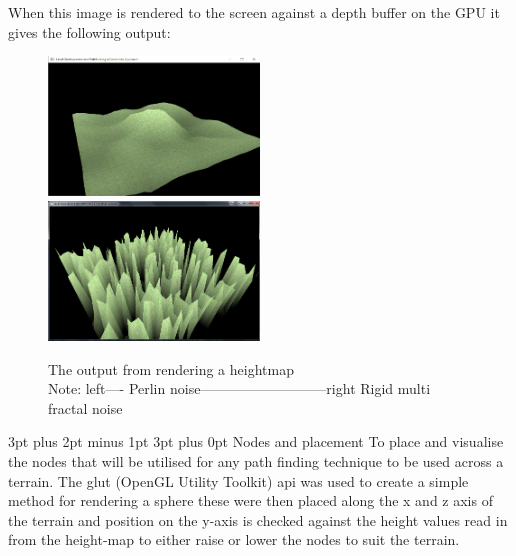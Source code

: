 \documentclass[12pt,a4paper]{article}
\makeatletter
\renewcommand\subsection{\@startsection {subsection}{1}{2mm} %
                               {3pt plus 2pt minus 1pt} %
                               {3pt plus 0pt} %
                               {\normalfont\bfseries}}
\makeatother
\begin{document}
\pagebreak
When this image is rendered to the screen against a depth buffer on the GPU it gives the following output:
\begin{figure}[ht!]
	\includegraphics[width=0.5\textwidth]{images/Heightmap-output}
	\includegraphics[width=0.5\textwidth]{images/RMFoutput}
	\caption{The output from rendering a heightmap\\ Note: left---- Perlin noise---------------------------right Rigid multi fractal noise } \label{heightmap}
\end{figure}


\subsection{Nodes and placement} 
To place and visualise the nodes that will be utilised for any path finding technique to be used across a terrain. The glut (OpenGL Utility Toolkit) api was used to create a simple method for rendering a sphere these were then placed along the x and z axis of the terrain and position on the y-axis is checked against the height values read in from the height-map to either raise or lower the nodes to suit the terrain. 
\end{document}

